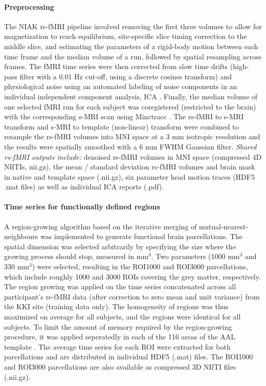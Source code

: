 \documentclass[preprint,12pt,3p]{elsarticle}
\begin{document}
\paragraph{Preprocessing} The NIAK rs-fMRI pipeline involved removing the first three volumes to allow for magnetization to reach equilibrium, site-specific slice timing correction to the middle slice, and estimating the parameters of a rigid-body motion between each time frame and the median volume of a run, followed by spatial resampling across frames. The fMRI time series were then corrected from slow time drifts (high-pass filter with a 0.01 Hz cut-off, using a discrete cosines transform) and physiological noise using an automated labeling of noise components in an individual independent component analysis, ICA \citep{perlbarg2007corsica}. Finally, the median volume of one selected fMRI run for each subject was coregistered (restricted to the brain) with the corresponding s-MRI scan using Minctracc \cite{collins1994automatic}. The rs-fMRI to s-MRI transform and s-MRI to template (non-linear) transform were combined to resample the rs-fMRI volumes into MNI space at a 3 mm isotropic resolution and the results were spatially smoothed with a 6 mm FWHM Gaussian filter. \emph{Shared rs-fMRI outputs include:} denoised rs-fMRI volumes in MNI space (compressed 4D NIfTIs, nii.gz), the mean / standard deviation rs-fMRI volumes and brain mask in native and template space (.nii.gz), six parameter head motion traces (HDF5 .mat files) as well as individual ICA reports (.pdf).   

\paragraph{Time series for functionally defined regions} A region-growing algorithm \citep{bellec2006identification} based on the iterative merging of mutual-nearest-neighbours was implemented to generate functional brain parcellations. The spatial dimension was selected arbitrarily by specifying the size where the growing process should stop, measured in mm$^3$. Two parameters (1000 mm$^3$ and 330 mm$^3$) were selected, resulting in the ROI1000 and ROI3000 parcellations, which include roughly 1000 and 3000 ROIs covering the grey matter, respectively. The region growing was applied on the time series concatenated across all participant's rs-fMRI data (after correction to zero mean and unit variance) from the KKI site (training data only). The homogeneity of regions was thus maximized on average for all subjects, and the regions were identical for all subjects. To limit the amount of memory required by the region-growing procedure, it was applied seperatedly in each of the 116 areas of the AAL template \citep{tzourio2002automated}. The average time series for each ROI were extracted for both parcellations and are distributed in individual HDF5 (.mat) files. The ROI1000 and ROI3000 parcellations are also available as compressed 3D NIfTI files (.nii.gz).
\end{document}
